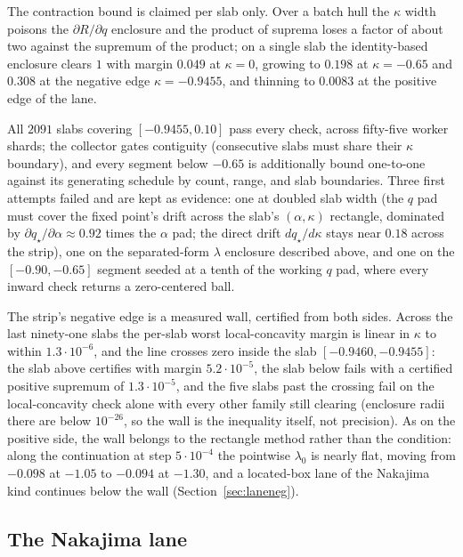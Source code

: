 \documentclass[11pt]{article}
\theoremstyle{remark}
\begin{document}
The contraction bound is claimed per slab only.  Over a batch hull
the $\kappa$ width poisons the $\partial R/\partial q$ enclosure and
the product of suprema loses a factor of about two against the
supremum of the product; on a single slab the identity-based
enclosure clears $1$ with margin $0.049$ at $\kappa=0$, growing to
$0.198$ at $\kappa=-0.65$ and $0.308$ at the negative edge
$\kappa=-0.9455$, and thinning to $0.0083$ at the positive edge of
the lane.

All $2091$ slabs covering $[-0.9455,0.10]$ pass every check, across
fifty-five worker shards; the collector gates contiguity (consecutive
slabs must share their $\kappa$ boundary), and every segment
below $-0.65$ is additionally bound one-to-one against its
generating schedule by count, range, and slab boundaries.
Three first attempts failed and are kept as evidence: one at doubled
slab width
(the $q$ pad must cover the fixed point's drift across the slab's
$(\alpha,\kappa)$ rectangle, dominated by $\partial q_\star/\partial
\alpha\approx0.92$ times the $\alpha$ pad; the direct drift
$dq_\star/d\kappa$ stays near $0.18$ across the strip), one on the
separated-form $\lambda$ enclosure described above, and one on the
$[-0.90,-0.65]$ segment seeded at a tenth of the working $q$ pad,
where every inward check returns a zero-centered ball.

The strip's negative edge is a measured wall, certified from both
sides.  Across the last ninety-one slabs the per-slab worst
local-concavity margin is linear in $\kappa$ to within
$1.3\cdot10^{-6}$, and the line crosses zero inside the slab
$[-0.9460,-0.9455]$: the slab above certifies with margin
$5.2\cdot10^{-5}$, the slab below fails with a certified positive
supremum of $1.3\cdot10^{-5}$, and the five slabs past the
crossing fail on the local-concavity check alone with every other
family still clearing (enclosure radii there are below $10^{-26}$,
so the wall is the inequality itself, not precision).  As on the
positive side, the wall belongs to the rectangle method rather
than the condition: along the continuation at step $5\cdot10^{-4}$
the pointwise $\lambda_0$ is nearly flat, moving from $-0.098$ at
$-1.05$ to $-0.094$ at $-1.30$, and a located-box lane of the
Nakajima kind continues below the wall
(Section~\ref{sec:laneneg}).

\subsection{The Nakajima lane}\label{sec:nak}
\end{document}
